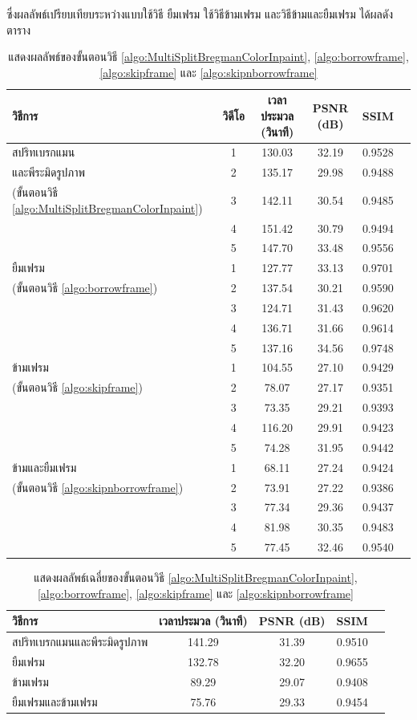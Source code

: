 \documentclass[hidelinks, a4paper,12pt]{article}
\numberwithin{equation}{section}							%
\numberwithin{equation}{section}
\begin{document}
{	 ซึ่งผลลัพธ์เปรียบเทียบระหว่างแบบใช้วิธี ยืมเฟรม ใช้วิธีข้ามเฟรม และวิธีข้ามและยืมเฟรม ได้ผลดังตาราง
		\begin{table}[H]
		\small
		\centering
		\begin{tabular}[ht]{|l|c|c|c|c|c|}
			\hline
			วิธีการ  & วิดีโอ &เวลาประมวล  (วินาที) & PSNR (dB) & SSIM \\
			\hline
			สปริทเบรกแมน & 1 & 130.03  & 32.19 & 0.9528  \\ 
			และพีระมิดรูปภาพ& 2 & 135.17 & 29.98 & 0.9488 \\
			(ขั้นตอนวิธี \ref{algo:MultiSplitBregmanColorInpaint})& 3 & 142.11 & 30.54 & 0.9485 \\
			& 4 & 151.42 & 30.79 & 0.9494 \\
			& 5 & 147.70 & 33.48 & 0.9556 \\
			\hline
			ยืมเฟรม & 1 & 127.77  & 33.13& 0.9701 \\ 
			(ขั้นตอนวิธี \ref{algo:borrowframe})& 2 & 137.54 & 30.21 & 0.9590 \\
			& 3 & 124.71 & 31.43 & 0.9620 \\
			& 4 & 136.71 & 31.66 & 0.9614 \\
			& 5 & 137.16 & 34.56 &  0.9748 \\
			\hline
			ข้ามเฟรม & 1 &  104.55 & 27.10 &  0.9429\\ 
			(ขั้นตอนวิธี \ref{algo:skipframe})& 2 & 78.07 & 27.17 & 0.9351 \\
			& 3 & 73.35 & 29.21 & 0.9393\\
			& 4 & 116.20 & 29.91 & 0.9423 \\
			& 5 & 74.28 & 31.95 &  0.9442\\
			\hline
			ข้ามและยืมเฟรม & 1 & 68.11 & 27.24 & 0.9424 \\ 
			(ขั้นตอนวิธี \ref{algo:skipnborrowframe})& 2 & 73.91 & 27.22 & 0.9386 \\
			& 3 & 77.34 & 29.36 & 0.9437 \\
			& 4 & 81.98 & 30.35 & 0.9483  \\
			& 5 & 77.45  & 32.46 & 0.9540 \\
			\hline
		\end{tabular}
		\caption{แสดงผลลัพธ์ของขั้นตอนวิธี \ref{algo:MultiSplitBregmanColorInpaint}, \ref{algo:borrowframe}, \ref{algo:skipframe} และ \ref{algo:skipnborrowframe}}
	\end{table}	
	\begin{table}[H]
		\centering
		\begin{tabular}[ht]{|l|c|c|c|c|}
			\hline
			วิธีการ  & เวลาประมวล  (วินาที) & PSNR (dB) & SSIM \\
			\hline
			สปริทเบรกแมนและพีระมิดรูปภาพ & 141.29 & 31.39  &  0.9510\\
			ยืมเฟรม & 132.78 & 32.20 & 0.9655\\
			ข้ามเฟรม & 89.29 & 29.07 & 0.9408 \\
			ยืมเฟรมและข้ามเฟรม & 75.76 & 29.33 & 0.9454 \\
			\hline
		\end{tabular}
		\caption{แสดงผลลัพธ์เฉลี่ยของขั้นตอนวิธี \ref{algo:MultiSplitBregmanColorInpaint}, \ref{algo:borrowframe}, \ref{algo:skipframe} และ \ref{algo:skipnborrowframe}}
	\end{table}	
	
}
\end{document}
